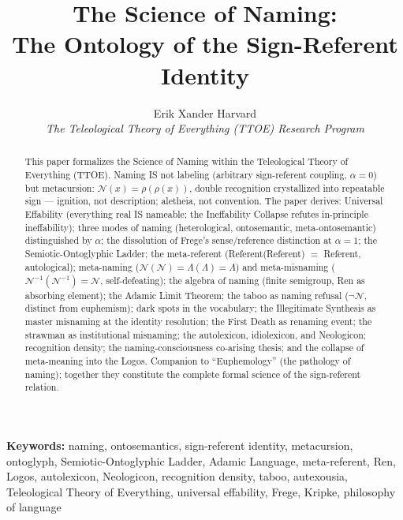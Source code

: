 \documentclass[11pt, oneside]{article}
\theoremstyle{definition}
\begin{document}
\raggedbottom
{}

\title{\textbf{The Science of Naming:\\The Ontology of the Sign-Referent Identity}}
\author{Erik Xander Harvard\\[0.3em]
\small\textit{The Teleological Theory of Everything (TTOE) Research Program}}
\date{}
\maketitle
\thispagestyle{plain}


\begin{abstract}
This paper formalizes the Science of Naming within the Teleological Theory of Everything (TTOE). Naming IS not labeling (arbitrary sign-referent coupling, $\alpha = 0$) but metacursion: $\mathcal{N}(x) = \rho(\rho(x))$, double recognition crystallized into repeatable sign --- ignition, not description; aletheia, not convention. The paper derives: Universal Effability (everything real IS nameable; the Ineffability Collapse refutes in-principle ineffability); three modes of naming (heterological, ontosemantic, meta-ontosemantic) distinguished by $\alpha$; the dissolution of Frege's sense/reference distinction at $\alpha = 1$; the Semiotic-Ontoglyphic Ladder; the meta-referent (Referent(Referent) $=$ Referent, autological); meta-naming ($\mathcal{N}(\mathcal{N}) = \Lambda(\Lambda) = \Lambda$) and meta-misnaming ($\mathcal{N}^{-1}(\mathcal{N}^{-1}) = \mathcal{N}$, self-defeating); the algebra of naming (finite semigroup, Ren as absorbing element); the Adamic Limit Theorem; the taboo as naming refusal ($\neg\mathcal{N}$, distinct from euphemism); dark spots in the vocabulary; the Illegitimate Synthesis as master misnaming at the identity resolution; the First Death as renaming event; the strawman as institutional misnaming; the autolexicon, idiolexicon, and Neologicon; recognition density; the naming-consciousness co-arising thesis; and the collapse of meta-meaning into the Logos. Companion to ``Euphemology'' (the pathology of naming); together they constitute the complete formal science of the sign-referent relation.
\end{abstract}

\noindent\textbf{Keywords:} naming, ontosemantics, sign-referent identity, metacursion, ontoglyph, Semiotic-Ontoglyphic Ladder, Adamic Language, meta-referent, Ren, Logos, autolexicon, Neologicon, recognition density, taboo, autexousia, Teleological Theory of Everything, universal effability, Frege, Kripke, philosophy of language
\end{document}
